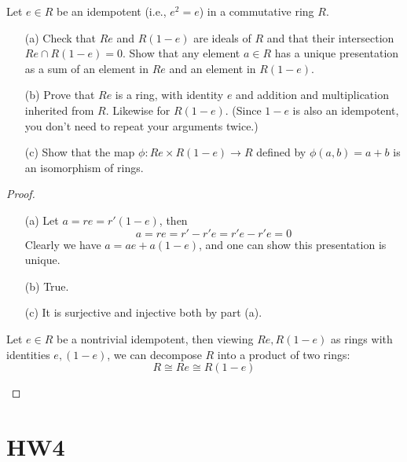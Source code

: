 \documentclass[openany]{book}
\begin{document}
\begin{prob}[Q7]
    Let \( e \in R \) be an idempotent (i.e., \( e^2 = e \)) in a commutative ring \( R \).

\begin{enumerate}
    \item[(a)] Check that \( Re \) and \( R(1 - e) \) are ideals of \( R \) and that their intersection \( Re \cap R(1 - e) = 0 \). Show that any element \( a \in R \) has a unique presentation as a sum of an element in \( Re \) and an element in \( R(1 - e) \).

    \item[(b)] Prove that \( Re \) is a ring, with identity \( e \) and addition and multiplication inherited from \( R \). Likewise for \( R(1 - e) \). (Since \( 1 - e \) is also an idempotent, you don't need to repeat your arguments twice.)

    \item[(c)] Show that the map \( \phi: Re \times R(1 - e) \to R \) defined by \( \phi(a, b) = a + b \) is an isomorphism of rings.
\end{enumerate}
\end{prob}
\begin{proof}
    \begin{enumerate}
        \item[(a)] Let $a=re=r'(1-e)$, then 
        \begin{equation*}
            a=re=r'-r'e=r'e-r'e=0
        \end{equation*}
        Clearly we have $a=ae+a(1-e)$, and one can show this presentation is unique.
        \item[(b)] True.
        \item[(c)] It is surjective and injective both by part (a). 
    \end{enumerate}
    \begin{prop}
        Let $e\in R$ be a nontrivial idempotent, then viewing $Re, R(1-e)$ as rings with identities $e, (1-e)$, we can decompose $R$ into a product of two rings:
        \begin{equation*}
            R\cong Re\cong R(1-e)
        \end{equation*}
    \end{prop}
\end{proof}


\chapter{HW4}
\end{document}
